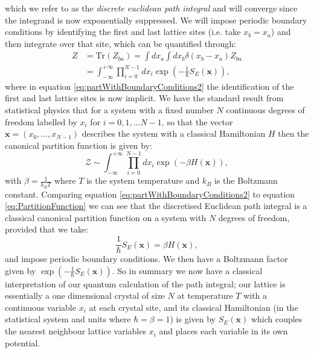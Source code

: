 \documentclass[12pt]{article}
\begin{document}
        which we refer to as the \textit{discrete euclidean path integral} and will converge since the integrand is now exponentially suppressed. We will impose periodic boundary conditions by identifying the first and last lattice sites (i.e. take $x_b=x_a$) and then integrate over that site, which can be quantified through: 
        \begin{align}
            \label{eq:partWithBoundaryConditions1}
            Z & = \text{Tr}\left(Z_{ba}\right) = \int dx_a \int dx_b \delta\left(x_b-x_a\right)Z_{ba} \\
            \label{eq:partWithBoundaryConditions2}
              & = \int^{+\infty}_{-\infty}\prod_{i=0}^{N-1}dx_i \exp{\left(-\frac{1}{\hbar}S_{E}\left(\bm{x}\right)\right)},
        \end{align}
        where in equation \ref{eq:partWithBoundaryConditions2} the identification of the first and last lattice sites is now implicit. We have the standard result from statistical physics that for a system with a fixed number $N$ continuous degrees of freedom labelled by $x_i$ for $i=0,1,\dots N-1$, so that the vector $\bm{x}=\left(x_0,\dots,x_{N-1}\right)$ describes the system with a classical Hamiltonian $H$ then the canonical partition function is given by:
        \begin{equation}
            \label{eq:PartitionFunction}
            \mathcal{Z} \sim \int_{-\infty}^{+\infty}\prod_{i=0}^{N-1}dx_{i}\exp{\left(-\beta H\left(\bm{x}\right)\right)},
        \end{equation}
        with $\beta=\frac{1}{k_{B}T}$ where $T$ is the system temperature and $k_{B}$ is the Boltzmann constant. Comparing equation \ref{eq:partWithBoundaryConditions2} to equation \ref{eq:PartitionFunction} we can see that the discretised Euclidean path integral is a classical canonical partition function on a system with $N$ degrees of freedom, provided that we take:
        \begin{equation}
            \label{ActionToHamiltonian}
            \frac{1}{\hbar}S_{E}\left(\bm{x}\right) = \beta H\left(\bm{x}\right),
        \end{equation}
        and impose periodic boundary conditions. We then have a Boltzmann factor given by $\exp{\left(-\frac{1}{\hbar}S_{E}\left(\bm{x}\right)\right)}$. So in summary we now have a classical interpretation of our quantum calculation of the path integral; our lattice is essentially a one dimensional crystal of size $N$ at temperature $T$ with a continuous variable $x_i$ at each crystal site, and its classical Hamiltonian (in the statistical system and units where $\hbar=\beta=1$) is given by $S_E\left(\bm{x}\right)$ which couples the nearest neighbour lattice variables $x_i$ and places each variable in its own potential. 
\end{document}
